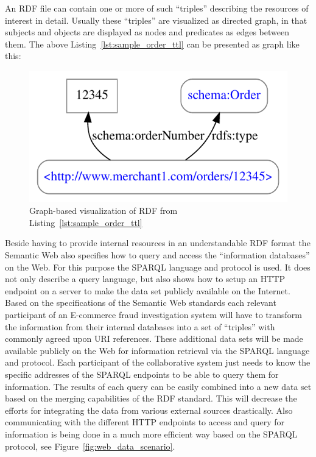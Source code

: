 
An \gls{RDF} file can contain one or more of such ``triples'' describing the resources of interest in detail. Usually these ``triples'' are visualized as directed graph, in that subjects and objects are displayed as nodes and predicates as edges between them. The above Listing~\ref{lst:sample_order_ttl} can be presented as graph like this:\@

\begin{figure}[H]
  \centering
  \includegraphics[width=0.8\columnwidth]{images/sample_order_12345.pdf}
  \caption{Graph-based visualization of \gls{RDF} from Listing~\ref{lst:sample_order_ttl}}
\label{fig:sample_order_graph_image}
\end{figure}

Beside having to provide internal resources in an understandable \gls{RDF} format the Semantic Web also specifies how to query and access the ``information databases'' on the Web. For this purpose the \gls{SPARQL} language and protocol is used. It does not only describe a query language, but also shows how to setup an \gls{HTTP} endpoint on a server to make the data set publicly available on the Internet. \\

Based on the specifications of the Semantic Web standards each relevant participant of an \gls{E-commerce} fraud investigation system will have to transform the information from their internal databases into a set of ``triples'' with commonly agreed upon \gls{URI} references. These additional data sets will be made available publicly on the Web for information retrieval via the \gls{SPARQL} language and protocol. Each participant of the collaborative system just needs to know the specific addresses of the \gls{SPARQL} endpoints to be able to query them for information. The results of each query can be easily combined into a new data set based on the merging capabilities of the \gls{RDF} standard. This will decrease the efforts for integrating the data from various external sources drastically. Also communicating with the different \gls{HTTP} endpoints to access and query for information is being done in a much more efficient way based on the \gls{SPARQL} protocol, see Figure~\ref{fig:web_data_scenario}. \@

